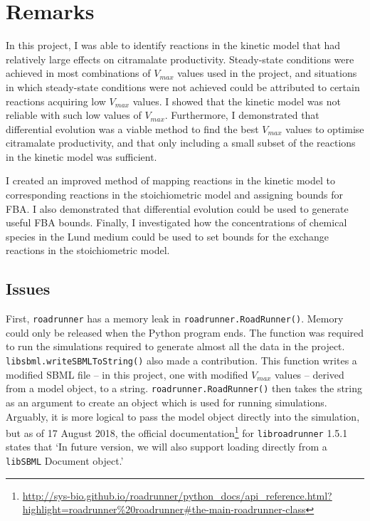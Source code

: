 \documentclass[parskip=full, numbers=noenddot]{scrreprt}
\begin{document}
\chapter{Remarks}
\label{ch:remarks}

In this project, I was able to identify reactions in the kinetic model that had relatively large effects on citramalate productivity. Steady-state conditions were achieved in most combinations of $V_{max}$ values used in the project, and situations in which steady-state conditions were not achieved could be attributed to certain reactions acquiring low $V_{max}$ values. I showed that the kinetic model was not reliable with such low values of $V_{max}$. Furthermore, I demonstrated that differential evolution was a viable method to find the best $V_{max}$ values to optimise citramalate productivity, and that only including a small subset of the reactions in the kinetic model was sufficient.

I created an improved method of mapping reactions in the kinetic model to corresponding reactions in the stoichiometric model and assigning bounds for FBA. I also demonstrated that differential evolution could be used to generate useful FBA bounds. Finally, I investigated how the concentrations of chemical species in the Lund medium could be used to set bounds for the exchange reactions in the stoichiometric model.

\section{Issues}
\label{sec:issues}

First, \texttt{roadrunner} has a memory leak in \texttt{roadrunner.RoadRunner()}. Memory could only be released when the Python program ends. The function was required to run the simulations required to generate almost all the data in the project. \texttt{libsbml.writeSBMLToString()} also made a contribution. This function writes a modified SBML file -- in this project, one with modified $V_{max}$ values -- derived from a model object, to a string. \texttt{roadrunner.RoadRunner()} then takes the string as an argument to create an object which is used for running simulations. Arguably, it is more logical to pass the model object directly into the simulation, but as of 17 August 2018, the official documentation\footnote{\url{http://sys-bio.github.io/roadrunner/python\_docs/api\_reference.html?highlight=roadrunner\%20roadrunner#the-main-roadrunner-class}} for \texttt{libroadrunner} 1.5.1 states that `In future version, we will also support loading directly from a \texttt{libSBML} Document object.'
\end{document}
